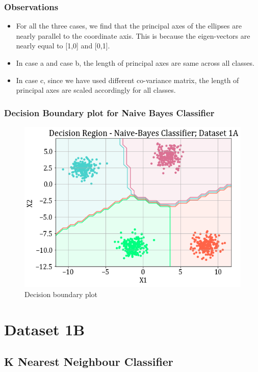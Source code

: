 \documentclass[11pt,a4paper]{article}
\newcommand{\noi}{\noindent}
\begin{document}
\subsubsection{Observations} 
\begin{itemize}
    \itemsep0em
    \item For all the three cases, we find that the principal axes of the ellipses are nearly parallel to the coordinate axis. This is because the eigen-vectors are nearly equal to [1,0] and [0,1].
    \item In case a and case b, the length of principal axes are same across all classes. 
    \item In case c, since we have used different co-variance matrix, the length of principal axes are scaled accordingly for all classes.
\end{itemize}

\subsubsection{Decision Boundary plot for Naive Bayes Classifier}
\begin{figure}[H]
    \centering
    \includegraphics[scale=0.6]{images/1A/1A_nb_case1_decisionregion.png}
    \caption{Decision boundary plot}
    \label{fig:db1}
\end{figure}

\noi

\break
\section{Dataset 1B}
\subsection{K Nearest Neighbour Classifier} 
\end{document}
